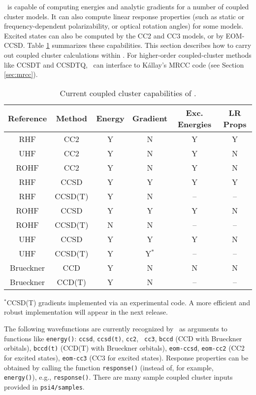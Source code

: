 \PSIfour\ is capable of computing energies and analytic gradients for a
number of coupled cluster models.  It can also compute linear response
properties (such as static or frequency-dependent polarizability,
or optical rotation angles) for some models.  Excited states can
also be computed by the CC2 and CC3 models, or by EOM-CCSD.  Table
\ref{table:ccsummary} summarizes these capabilities.  This section
describes how to carry out coupled cluster calculations within \PSIfour.
For higher-order coupled-cluster methods like CCSDT and CCSDTQ, \PSIfour\
can interface to K{\'a}llay's MRCC code (see Section \ref{sec:mrcc}).


\begin{table}[h]
\begin{center}
\caption{Current coupled cluster capabilities of \PSIfour.}
\label{table:ccsummary}
\begin{tabular}{cccccc}
\hline
\hline
Reference & Method & Energy    & Gradient  &  Exc. Energies & LR Props \\
\hline
RHF       & CC2     & Y & N & Y & Y  \\
UHF       & CC2     & Y & N & Y & N  \\
ROHF      & CC2     & Y & N & Y & N  \\
RHF       & CCSD    & Y & Y & Y & Y  \\
RHF       & CCSD(T) & Y & N & --& -- \\
ROHF      & CCSD    & Y & Y & Y & N  \\
ROHF      & CCSD(T) & N & N & --& -- \\
UHF       & CCSD    & Y & Y & Y & N  \\
UHF       & CCSD(T) & Y & Y$^*$ & --& -- \\
Brueckner & CCD     & Y & N & N & N  \\
Brueckner & CCD(T)  & Y & N & --& -- \\
\hline
\hline
\end{tabular}
\end{center}
{\footnotesize $^*$CCSD(T) gradients implemented via an experimental code.
A more efficient and robust implementation will appear in the next
release.}
\end{table}

The following wavefunctions are currently recognized by \PSIfour\ as arguments
to functions like {\tt energy()}: {\tt ccsd}, {\tt ccsd(t)}, {\tt cc2}, {\tt
cc3}, {\tt bccd} (CCD with Brueckner orbitals), {\tt bccd(t)} (CCD(T) with
Brueckner orbitals), {\tt eom-ccsd}, {\tt eom-cc2} (CC2 for excited states),
{\tt eom-cc3} (CC3 for excited states).  Response properties can be obtained
by calling the function {\tt response()} (instead of, for example, {\tt
energy()}), e.g., {\tt response(\qq{ccsd}\qq)}.  There are many sample
coupled cluster inputs provided in {\tt psi4/samples}.

